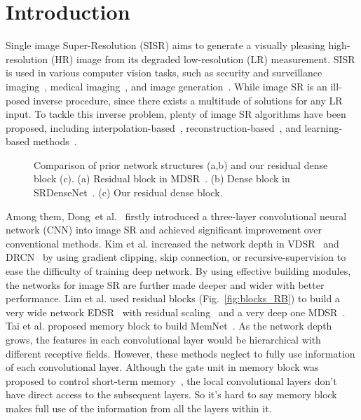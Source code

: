 \documentclass[10pt,twocolumn,letterpaper]{article}
\begin{document}
\section{Introduction}
Single image Super-Resolution (SISR)  aims to generate a visually pleasing high-resolution (HR) image from its degraded low-resolution (LR) measurement. SISR is used in various computer vision tasks, such as security and surveillance imaging~\cite{zou2012very}, medical imaging~\cite{shi2013cardiac}, and image generation~\cite{karras2018progressive}. While image SR is an ill-posed inverse procedure, since there exists a multitude of solutions for any LR input. To tackle this inverse problem, plenty of image SR algorithms have been proposed, including interpolation-based~\cite{zhang2006edge}, reconstruction-based~\cite{zhang2012single}, and learning-based methods~\cite{timofte2013anchored,timofte2014a+,peleg2014statistical,dong2014learning,schulter2015fast,huang2015single,kim2016accurate,tong2017image,zhang2018learning}.
\begin{figure}[t]
\centering
\centerline{
}
\centerline{
}

\caption{Comparison of prior network structures (a,b) and our residual dense block (c). (a) Residual block in MDSR~\cite{lim2017enhanced}. (b) Dense block in SRDenseNet~\cite{tong2017image}. (c) Our residual dense block.}  
\label{fig:blocks_RB_DB_RDB}
\vspace{-4mm}
\end{figure}

Among them, Dong~et al.~\cite{dong2014learning} firstly introduced a three-layer convolutional neural network (CNN) into image SR and achieved significant improvement over conventional methods. Kim et al. increased the network depth in VDSR~\cite{kim2016accurate} and DRCN~\cite{kim2016deeply} by using gradient clipping, skip connection, or recursive-supervision to ease the difficulty of training deep network. By using effective building modules, the networks for image SR are further made deeper and wider with better performance. Lim et al. used residual blocks (Fig.~\ref{fig:blocks_RB}) to build a very wide network EDSR~\cite{lim2017enhanced} with residual scaling~\cite{szegedy2017inception} and a very deep one MDSR~\cite{lim2017enhanced}. Tai et al. proposed memory block to build MemNet~\cite{tai2017memnet}. As the network depth grows, the features in each convolutional layer would be hierarchical with different receptive fields. However, these methods neglect to fully use information of each convolutional layer. Although the gate unit in memory block was proposed to control short-term memory~\cite{tai2017memnet}, the local convolutional layers don't have direct access to the subsequent layers. So it's hard to say memory block makes full use of the information from all the layers within it. 
\end{document}
